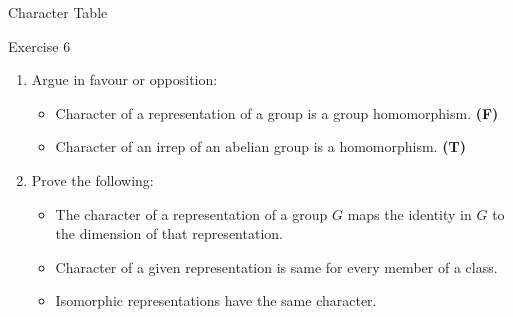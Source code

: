 \documentclass{beamer}
\begin{document}
\begin{frame}{Character Table}
    \begin{definition}
        
    \end{definition}
\end{frame}

\begin{frame}{Exercise 6}
    \begin{enumerate}
        \item Argue in favour or opposition:
        \begin{itemize}
            \item Character of a representation of a group is a group homomorphism. \textbf{(F)}
            \item Character of an irrep of an abelian group is a homomorphism. \textbf{(T)}
        \end{itemize}
        \item Prove the following:
        \begin{itemize}
            \item The character of a representation of a group $G$ maps the identity in $G$ to the dimension of that representation.
            \item Character of a given representation is same for every member of a class.
            \item Isomorphic representations have the same character.
        \end{itemize}
    \end{enumerate}
\end{frame}
\end{document}
